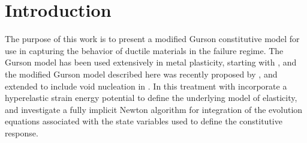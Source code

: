 \chapter{Introduction}
\label{intro}

The purpose of this work is to present a modified Gurson constitutive
model for use in capturing the behavior of ductile materials in the
failure regime. The Gurson model has been used extensively in metal
plasticity, starting with \cite{Gurson1977}, and the modified Gurson
model described here was recently proposed by \cite{Nahshon2008}, and
extended to include void nucleation in \cite{Nahshon2009}. In this
treatment with incorporate a hyperelastic strain energy potential to
define the underlying model of elasticity, and investigate a fully
implicit Newton algorithm for integration of the evolution equations
associated with the state variables used to define the constitutive
response.

